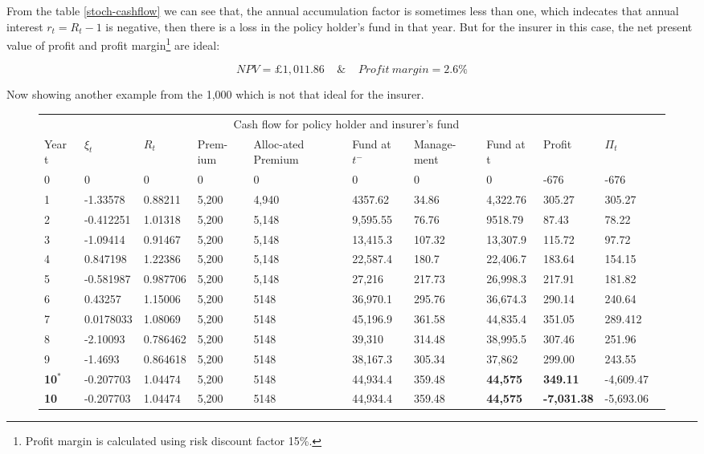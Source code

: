 \documentclass{report}
\begin{document}
{From the table \ref{stoch-cashflow} we can see that, the annual accumulation factor is sometimes less than one, which indecates that annual interest $r_t = R_t - 1$ is negative, then there is a loss in the policy holder's fund in that year. But for the insurer in this case, the net present value of profit and profit margin\footnote{Profit margin is calculated using risk discount factor 15\%.} are ideal: 

\[
NPV=\pounds 1,011.86\ \ \ \   \   \& \    \ \ \ \       Profit \  margin = 2.6\%
\]

Now showing another example from the 1,000 which is not that ideal for the insurer.

\begin{figure}[H]
\begin{tabular}{p{0.5cm} p{1.5cm} p{1.3cm} p{1cm} p{1.5cm} p{1.2cm} p{1.3cm} p{1.3cm}p{1.6cm}p{1.5cm}p{1.3cm} }
\toprule
\multicolumn{10}{c}{Cash flow for policy holder and insurer's fund} \\
\cmidrule(r){3-8}

Year t & $\xi_t$ &$R_t$ & Prem-ium & Alloc-ated Premium & Fund at $t^-$ &Manage-ment & Fund at t& Profit& $\Pi_t$ \\
\midrule
0&0&0&0&0&0&0&0&-676&-676\\
1&-1.33578&0.88211&5,200&4,940&4357.62&34.86&4,322.76&305.27&305.27\\
2&-0.412251&1.01318&5,200&5,148&9,595.55&76.76&9518.79&87.43&78.22\\
3&-1.09414&0.91467&5,200&5,148&13,415.3&107.32&13,307.9&115.72&97.72\\
4&0.847198&1.22386&5,200&5,148&22,587.4&180.7&22,406.7&183.64&154.15\\
5&-0.581987&0.987706&5,200&5,148&27,216&217.73&26,998.3&217.91&181.82\\
6&0.43257&1.15006&5,200&5148&36,970.1&295.76&36,674.3&290.14&240.64\\
7&0.0178033&1.08069&5,200&5148&45,196.9&361.58&44,835.4&351.05&289.412\\
8&-2.10093&0.786462&5,200&5148&39,310&314.48&38,995.5&307.46&251.96\\
9&-1.4693&0.864618&5,200&5148&38,167.3&305.34&37,862&299.00&243.55\\
\textbf{10$^*$}&-0.207703&1.04474&5,200&5148&44,934.4&359.48&\textbf{44,575}&\textbf{349.11}&-4,609.47\\
\textbf{10}&-0.207703&1.04474&5,200&5148&44,934.4&359.48&\textbf{44,575}&\textbf{-7,031.38}&-5,693.06\\


\end{tabular}
\end{figure}}
\end{document}
